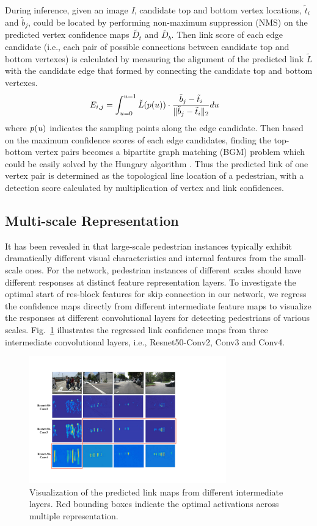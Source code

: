 \documentclass[runningheads]{llncs}
\begin{document}
During inference, given an image {\it I}, candidate top and bottom vertex locations, $\tilde{t}_{i}$ and $\tilde{b}_{j}$, could be located by performing non-maximum suppression (NMS) on the predicted vertex conﬁdence maps $\tilde{D_{t}}$ and $\tilde{D_{b}}$. Then link score of each edge candidate (i.e., each pair of possible connections between candidate top and bottom vertexes) is calculated by measuring the alignment of the predicted link $\tilde{L}$ with the candidate edge that formed by connecting the candidate top and bottom vertexes.
\begin{align}
	E_{i, j} &= \int_{u=0}^{u=1} \tilde{L}(p(u))\cdot \dfrac{\tilde{b}_{j}-\tilde{t}_{i}} {\Arrowvert\tilde{b}_{j}-\tilde{t}_{i}\Arrowvert_{2}}du
\end{align}
where ${\it p(u)}$ indicates the sampling points along the edge candidate. Then based on the maximum confidence scores of each edge candidates, finding the top-bottom vertex pairs becomes a bipartite graph matching (BGM) \cite{BGM} problem which could be easily solved by the Hungary algorithm \cite{Hungarian}. Thus the predicted link of one vertex pair is determined as the topological line location of a pedestrian, with a detection score calculated by multiplication of vertex and link confidences.

\subsection{Multi-scale Representation}\label{sec:multi-rep}

It has been revealed in \cite{SAFRCNN,ADM} that large-scale pedestrian instances typically exhibit dramatically different visual characteristics and internal features from the small-scale ones. For the network, pedestrian instances of different scales should have different responses at distinct feature representation layers. To investigate the optimal start of res-block features for skip connection in our network, we regress the confidence maps directly from different intermediate feature maps to visualize the responses at different convolutional layers for detecting pedestrians of various scales. Fig.~\ref{fig4} illustrates the regressed link confidence maps from three intermediate convolutional layers, i.e., Resnet50-Conv2, Conv3 and Conv4.
\begin{figure}[t]
	\centering
	\includegraphics[height=5.5cm]{4_features.pdf}
	\caption{Visualization of the predicted link maps from different intermediate layers. Red bounding boxes indicate the optimal activations across multiple representation.}
	\label{fig4}
\end{figure}
\end{document}
